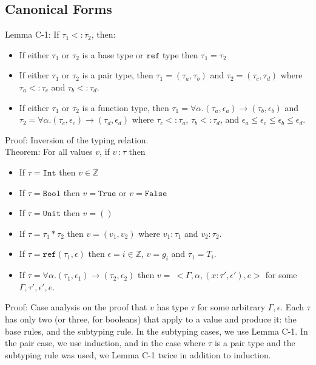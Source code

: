\documentclass{article}
\newcommand{\Z}{\mathbb{Z}}
\begin{document}
\subsection*{Canonical Forms}
Lemma C-1: If $\tau_1 <: \tau_2$, then:
\begin{itemize}
	\item If either $\tau_1$ or $\tau_2$ is a base type or $\texttt{ref}$ type then $\tau_1 = \tau_2$
	\item If either $\tau_1$ or $\tau_2$ is a pair type, then $\tau_1 = (\tau_a, \tau_b)$ and $\tau_2 = (\tau_c, \tau_d)$ where $\tau_a <: \tau_c$ and $\tau_b <: \tau_d$.
	\item If either $\tau_1$ or $\tau_2$ is a function type, then $\tau_1 = \forall \alpha. (\tau_a, \epsilon_a) \rightarrow (\tau_b, \epsilon_b)$ and $\tau_2 = \forall \alpha. (\tau_c, \epsilon_c) \rightarrow (\tau_d, \epsilon_d)$ where $\tau_c <: \tau_a$, $\tau_b <: \tau_d$, and $\epsilon_a \leq \epsilon_c \leq \epsilon_b \leq \epsilon_d$.
\end{itemize} 

\noindent Proof: Inversion of the typing relation.
\\

\noindent Theorem: For all values $v$, if $v\ \colon \tau$ then
\begin{itemize}
	\item If $\tau = \texttt{Int}$ then $v \in \Z$
	\item If $\tau = \texttt{Bool}$ then $v = \texttt{True}$ or $v = \texttt{False}$
	\item If $\tau = \texttt{Unit}$ then $v = ()$
	\item If $\tau = \tau_1 * \tau_2$ then $v = (v_1, v_2)$ where $v_1 : \tau_1$ and $v_2 : \tau_2$.
	\item If $\tau = \texttt{ref} (\tau_1, \epsilon)$ then $\epsilon = i \in \Z$, $v = g_i$ and $\tau_1 = T_i$.
	\item If $\tau = \forall \alpha.(\tau_1, \epsilon_1) \rightarrow (\tau_2, \epsilon_2)$ then $v =\ <\Gamma, \alpha, (x : \tau', \epsilon'), e>$ for some $\Gamma, \tau', \epsilon', e$.
\end{itemize}

\noindent Proof: Case analysis on the proof that $v$ has type $\tau$ for some arbitrary $\Gamma, \epsilon$. Each $\tau$ has only two (or three, for booleans) that apply to a value and produce it: the base rules, and the subtyping rule. In the subtyping cases, we use Lemma C-1. In the pair case, we use induction, and in the case where $\tau$ is a pair type and the subtyping rule was used, we Lemma C-1 twice in addition to induction.
\end{document}
